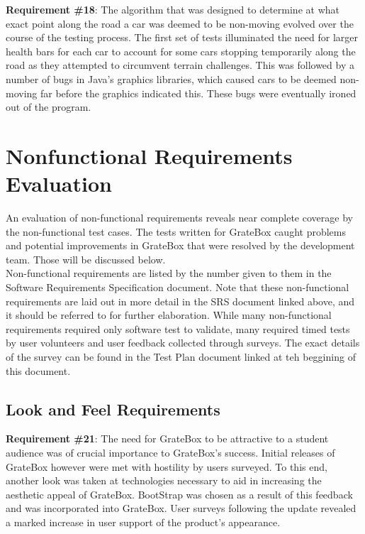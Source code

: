 \documentclass[12pt, titlepage]{article}
\begin{document}
\textbf{Requirement \#18}: The algorithm that was designed to determine at what exact point along the road a car was deemed to be non-moving evolved over the course of the testing process. The first set of tests illuminated the need for larger health bars for each car to account for some cars stopping temporarily along the road as they attempted to circumvent terrain challenges. This was followed by a number of bugs in Java's graphics libraries, which caused cars to be deemed non-moving far before the graphics indicated this. These bugs were eventually ironed out of the program.

\section{Nonfunctional Requirements Evaluation}

An evaluation of non-functional requirements reveals near complete coverage by the non-functional test cases. The tests written for GrateBox caught problems and  potential improvements in GrateBox that were resolved by the development team. Those will be discussed below.\\

Non-functional requirements are listed by the number given to them in the Software Requirements Specification document. Note that these non-functional requirements are laid out in more detail in the SRS document linked above, and it should be referred to for further elaboration. While many non-functional requirements required only software test to validate, many required timed tests by user volunteers and user feedback collected through surveys. The exact details of the survey can be found in the Test Plan document linked at teh beggining of this document.\\

\subsection{Look and Feel Requirements}

\textbf{Requirement \#21}: The need for GrateBox to be attractive to a student audience was of crucial importance to GrateBox's success. Initial releases of GrateBox however were met with hostility by users surveyed. To this end, another look was taken at technologies necessary to aid in increasing the aesthetic appeal of GrateBox. BootStrap was chosen as a result of this feedback and was incorporated into GrateBox. User surveys following the update revealed a marked increase in user support of the product's appearance.\\
\end{document}
